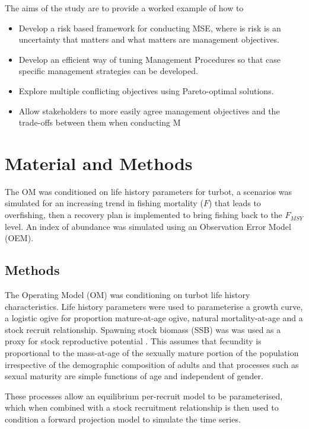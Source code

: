 \documentclass[12pt,doublespacing,a4paper]{ouparticle}
\begin{document}
The aims of the study are to provide a worked example of how to
 \begin{itemize}
  \item  Develop a risk based framework for conducting MSE,  where is risk is an uncertainty that matters and what matters are management objectives.
  \item  Develop an efficient way of tuning Management Procedures so that case specific management strategies can be developed.
  \item  Explore multiple conflicting objectives using Pareto-optimal solutions.
  \item  Allow stakeholders to more easily agree management objectives and the trade-offs between them when conducting M
 \end{itemize}


\section{Material and Methods}

The OM was conditioned on life history parameters for turbot, a scenarios was simulated for an increasing trend in fishing mortality ($F$) that leads to overfishing, then a recovery plan is implemented to bring fishing back to the $F_{MSY}$ level. An index of abundance was simulated using an Observation Error Model (OEM).


\subsection{Methods}

The  Operating Model (OM) was conditioning on turbot life history characteristics.  Life history parameters were used to parameterise a \cite{vonbert1957quantitative} growth curve, a logistic ogive for proportion mature-at-age ogive, natural mortality-at-age \citep{lorenzen2002density} and a \cite{beverton1993dynamics} stock recruit relationship. Spawning stock biomass (SSB) was was used as a proxy for stock reproductive potential \citep[SRP][]{trippel_estimation_1999,Trippel 1999,tomkiewicz2003avaliable}. This assumes that fecundity is proportional to the mass-at-age of the sexually mature portion of the population irrespective of the demographic composition of adults \citep{murawski_impacts_2001} and that processes such as sexual maturity are simple functions of age \citep{matsuda_inconsistency_1996} and independent of gender.

These processes allow an equilibrium per-recruit model to be parameterised, which when combined with a stock recruitment relationship \cite{sissenwine1987alternative} is then used to condition a forward projection model to simulate the time series.
\end{document}
